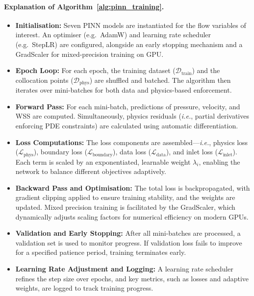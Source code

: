 \documentclass[12pt, a4paper]{article}
\begin{document}
\paragraph{Explanation of Algorithm~\ref{alg:pinn_training}.}
\begin{itemize}
    \item \textbf{Initialisation:} Seven PINN models are instantiated for the flow variables of interest. An optimiser (e.g.\ AdamW) and learning rate scheduler (e.g.\ StepLR) are configured, alongside an early stopping mechanism and a GradScaler for mixed-precision training on GPU.
    \item \textbf{Epoch Loop:} For each epoch, the training dataset ($\mathcal{D}_{\mathrm{train}}$) and the collocation points ($\mathcal{D}_{\mathrm{phys}}$) are shuffled and batched. The algorithm then iterates over mini-batches for both data and physics-based enforcement.
    \item \textbf{Forward Pass:} For each mini-batch, predictions of pressure, velocity, and WSS are computed. Simultaneously, physics residuals (\emph{i.e.}, partial derivatives enforcing PDE constraints) are calculated using automatic differentiation.
    \item \textbf{Loss Computations:} The loss components are assembled—\emph{i.e.}, physics loss ($\mathcal{L}_{\mathrm{phys}}$), boundary loss ($\mathcal{L}_{\mathrm{boundary}}$), data loss ($\mathcal{L}_{\mathrm{data}}$), and inlet loss ($\mathcal{L}_{\mathrm{inlet}}$). Each term is scaled by an exponentiated, learnable weight $\lambda_{i}$, enabling the network to balance different objectives adaptively.
    \item \textbf{Backward Pass and Optimisation:} The total loss is backpropagated, with gradient clipping applied to ensure training stability, and the weights are updated. Mixed precision training is facilitated by the GradScaler, which dynamically adjusts scaling factors for numerical efficiency on modern GPUs.
    \item \textbf{Validation and Early Stopping:} After all mini-batches are processed, a validation set is used to monitor progress. If validation loss fails to improve for a specified patience period, training terminates early.
    \item \textbf{Learning Rate Adjustment and Logging:} A learning rate scheduler refines the step size over epochs, and key metrics, such as losses and adaptive weights, are logged to track training progress.
\end{itemize}
\end{document}
